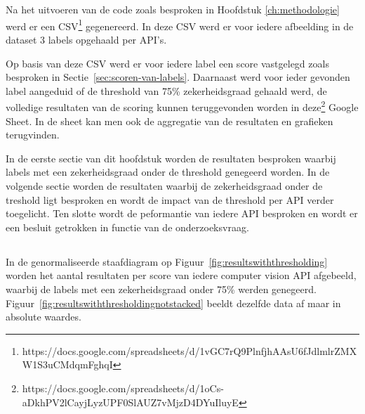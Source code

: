 
\chapter{}
\label{ch:resultaten}

\section{}
\label{sec:resultaten-inleiding}
Na het uitvoeren van de code zoals besproken in Hoofdstuk \ref{ch:methodologie} werd er een CSV\footnote{https://docs.google.com/spreadsheets/d/1vGC7rQ9PlnfjhAAsU6fJdlmlrZMXW1S3uCMdqmFghqI} gegenereerd. In deze CSV werd er voor iedere afbeelding in de dataset 3 labels opgehaald per API's.

Op basis van deze CSV werd er voor iedere label een score vastgelegd zoals besproken in Sectie~\ref{sec:scoren-van-labels}. Daarnaast werd voor ieder gevonden label aangeduid of de threshold van 75\% zekerheidsgraad gehaald werd, de volledige resultaten van de scoring kunnen teruggevonden worden in deze\footnote{https://docs.google.com/spreadsheets/d/1oCs-aDkhPV2lCayjLyzUPF0SlAUZ7vMjzD4DYuIluyE} Google Sheet. In de sheet kan men ook de aggregatie van de resultaten en grafieken terugvinden.

In de eerste sectie van dit hoofdstuk worden de resultaten besproken waarbij labels met een zekerheidsgraad onder de threshold genegeerd worden. In de volgende sectie worden de resultaten waarbij de zekerheidsgraad onder de treshold ligt besproken en wordt de impact van de threshold per API verder toegelicht. Ten slotte wordt de peformantie van iedere API besproken en wordt er een besluit getrokken in functie van de onderzoeksvraag.

\section{}
\label{sec:resultaten-met-thresholding}
In de genormaliseerde staafdiagram op Figuur~\ref{fig:resultswiththresholding} worden het aantal resultaten per score van iedere computer vision API afgebeeld, waarbij de labels met een zekerheidsgraad onder 75\% werden genegeerd. Figuur~\ref{fig:resultswiththresholdingnotstacked} beeldt dezelfde data af maar in absolute waardes.

